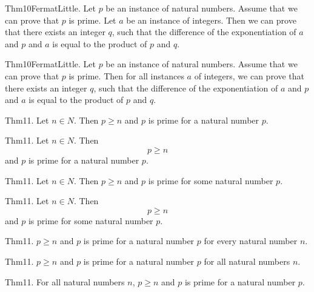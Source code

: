\documentclass{article}
\begin{document}
Thm10FermatLittle. Let $p$ be an instance of natural numbers. Assume that we can prove that $p$ is prime. Let $a$ be an instance of integers. Then we can prove that there exists an integer $q$, such that the difference of the exponentiation of $a$ and $p$ and $a$ is equal to the product of $p$ and $q$.

Thm10FermatLittle. Let $p$ be an instance of natural numbers. Assume that we can prove that $p$ is prime. Then for all instances $a$ of integers, we can prove that there exists an integer $q$, such that the difference of the exponentiation of $a$ and $p$ and $a$ is equal to the product of $p$ and $q$.

Thm11. Let $n \in N$. Then $p \geq n$ and $p$ is prime for a natural number $p$.

Thm11. Let $n \in N$. Then $$p \geq n$$ and $p$ is prime for a natural number $p$.

Thm11. Let $n \in N$. Then $p \geq n$ and $p$ is prime for some natural number $p$.

Thm11. Let $n \in N$. Then $$p \geq n$$ and $p$ is prime for some natural number $p$.

Thm11. $p \geq n$ and $p$ is prime for a natural number $p$ for every natural number $n$.

Thm11. $p \geq n$ and $p$ is prime for a natural number $p$ for all natural numbers $n$.

Thm11. For all natural numbers $n$, $p \geq n$ and $p$ is prime for a natural number $p$.
\end{document}
